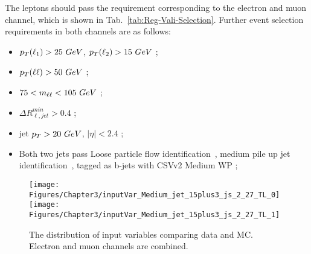 The leptons should pass the requirement corresponding to the electron and muon channel, which is shown in Tab.~\ref{tab:Reg-Vali-Selection}.
Further event selection requirements in both channels are as follows:
\begin{itemize}
\item $p_{T}(\ell_1) > 25~GeV$, $p_{T}(\ell_2) > 15~GeV$ ;
\item $p_{T}(\ell\ell) > 50~GeV$ ;
\item $75<m_{\ell\ell}<105~GeV$ ;
\item $\Delta R^{min}_{\ell, jet} > 0.4$ ;
\item jet $p_{T}>20~GeV$, $|\eta| < 2.4$ ;
\item Both two jets pass Loose particle flow identification~\cite{CMS-PAS-JME-16-003}, medium pile up jet identification~\cite{CMS-PAS-JME-13-005}, tagged as b-jets with CSVv2 Medium WP ;

\end{itemize}

\begin{figure*}[thb]
  \centering
  \texttt{[image: Figures/Chapter3/inputVar\_Medium\_jet\_15plus3\_js\_2\_27\_TL\_0]}\hfil
  \texttt{[image: Figures/Chapter3/inputVar\_Medium\_jet\_15plus3\_js\_2\_27\_TL\_1]}\hfil
  \caption{The distribution of input variables comparing data and
    MC. Electron and muon channels are combined.}
  \label{fig:b-reg-vali-input}
\end{figure*}

